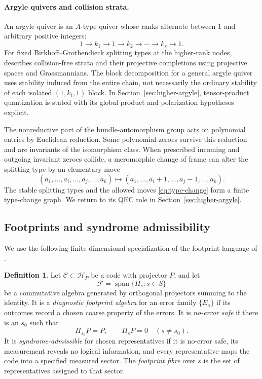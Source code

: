 \documentclass[11pt]{article}
\theoremstyle{definition}
\newtheorem{definition}[theorem]{Definition}
\theoremstyle{remark}
\newcommand{\cH}{\mathcal H}
\newcommand{\cF}{\mathcal F}
\newcommand{\cC}{\mathcal C}
\newcommand{\Span}{\operatorname{span}}
\begin{document}
\paragraph{Argyle quivers and collision strata.}

An argyle quiver is an $A$-type quiver whose ranks alternate between $1$ and arbitrary positive integers:
\begin{equation}\label{eq:argyle-shape}
  1\longrightarrow k_1\longrightarrow 1\longrightarrow k_2
  \longrightarrow\cdots\longrightarrow k_s\longrightarrow1.
\end{equation}
For fixed Birkhoff--Grothendieck splitting types at the higher-rank nodes, \cite{RayanSundboArgyle2018} describes collision-free strata and their projective completions using projective spaces and Grassmannians.  The block decomposition for a general argyle quiver uses stability induced from the entire chain, not necessarily the ordinary stability of each isolated $(1,k_i,1)$ block.  In Section~\ref{sec:higher-argyle}, tensor-product quantization is stated with its global product and polarization hypotheses explicit.

The nonreductive part of the bundle-automorphism group acts on polynomial entries by Euclidean reduction.  Some polynomial zeroes survive this reduction and are invariants of the isomorphism class.  When prescribed incoming and outgoing invariant zeroes collide, a meromorphic change of frame can alter the splitting type by an elementary move
\begin{equation}\label{eq:type-change}
 (a_1,\ldots,a_i,\ldots,a_j,\ldots,a_k)
 \longmapsto
 (a_1,\ldots,a_i+1,\ldots,a_j-1,\ldots,a_k).
\end{equation}
The stable splitting types and the allowed moves \eqref{eq:type-change} form a finite type-change graph.  We return to its QEC role in Section~\ref{sec:higher-argyle}.

\subsection{Footprints and syndrome admissibility}

We use the following finite-dimensional specialization of the footprint language of \cite{RayanDiagrammatic2026}.

\begin{definition}\label{def:footprint-algebra}
Let $\cC\subset\cH_P$ be a code with projector $P$, and let
\[
 \cF=\Span\{\Pi_s:s\in S\}
\]
be a commutative algebra generated by orthogonal projectors summing to the identity.
It is a \emph{diagnostic footprint algebra} for an error family $\{E_a\}$ if its outcomes record a chosen coarse property of the errors.  It is \emph{no-error safe} if there is an $s_0$ such that
\[
 \Pi_{s_0}P=P,\qquad \Pi_sP=0\quad(s\neq s_0).
\]
It is \emph{syndrome-admissible} for chosen representatives if it is no-error safe, its measurement reveals no logical information, and every representative maps the code into a specified measured sector.  The \emph{footprint fibre} over $s$ is the set of representatives assigned to that sector.
\end{definition}
\end{document}
